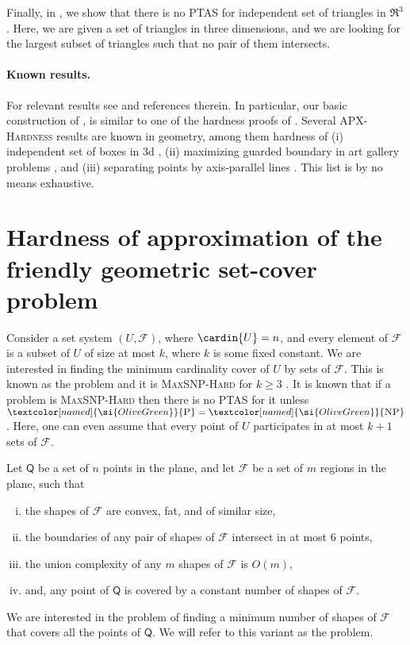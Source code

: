 \documentclass[12pt]{article}
\newcommand{\PntSet}{{\mathsf{Q}}}
\providecommand{\ComplexityClass}[1]{{{\textcolor[named]{\si{OliveGreen}}{\textsc{#1}}}}}
\providecommand{\APXHardness}{{\ComplexityClass{\si{APX}-Hardness}}\xspace}
\providecommand{\MaxSNPHard}{{\ComplexityClass{Max{S}NP-Hard}}\xspace}
\providecommand{\NP}{\ComplexityClass{NP}\xspace}
\providecommand{\POLYT}{\ComplexityClass{P}\xspace}
\providecommand{\PTAS}{\textsf{\si{PTAS}}\xspace}
\newcommand{\Family}{\mathcal{F}}
\begin{document}
Finally, in , we show that there is no \PTAS for
independent set of triangles in $\Re^3$. Here, we are given a set of
triangles in three dimensions, and we are looking for the largest
subset of triangles such that no pair of them intersects.

\paragraph{Known results.}
For relevant results see \cite{aes-ssena-09, cch-smcpg-09,
   mr-irghsp-09} and references therein. In particular, our basic
construction of , is similar to one of the hardness
proofs of \cite{el-dgig-08}. Several \APXHardness results are known in
geometry, among them hardness of (i) independent set of boxes in 3d
\cite{cc-ahopi-05}, (ii) maximizing guarded boundary in art gallery
problems \cite{fmz-mgbag-07}, and (iii) separating points by
axis-parallel lines \cite{cdkw-spapl-05}. This list is by no means
exhaustive.




\section{Hardness of approximation of the friendly
   geometric set-cover problem}

Consider a set system $(U, \Family)$, where $\cardin{U} = n$, and
every element of $\Family$ is a subset of $U$ of size at most $k$,
where $k$ is some fixed constant. We are interested in finding the
minimum cardinality cover of $U$ by sets of $\Family$. This is known
as the  problem and it is \MaxSNPHard for
$k \geq 3$ \cite{acgkm-ca-99}. It is known that if a problem is
\MaxSNPHard then there is no \PTAS for it unless $\POLYT=\NP$. Here,
one can even assume that every point of $U$ participates in at most
$k+1$ sets of $\Family$.

\begin{defn}
    Let $\PntSet$ be a set of $n$ points in the plane, and let
    $\Family$ be a set of $m$ regions in the plane, such that 
    \begin{enumerate}[(i)]
        \item the shapes of $\Family$ are convex, fat, and of similar
        size,

        \item the boundaries of any pair of shapes of $\Family$
        intersect in at most $6$ points,

        \item the union complexity of any $m$ shapes of $\Family$ is
        $O(m)$,

        \item and, any point of $\PntSet$ is covered by a constant number
        of shapes of $\Family$.
    \end{enumerate}
    We are interested in the problem of finding a minimum number of
    shapes of $\Family$ that covers all the points of $\PntSet$. We
    will refer to this variant as the  problem.
\end{defn}
\end{document}
